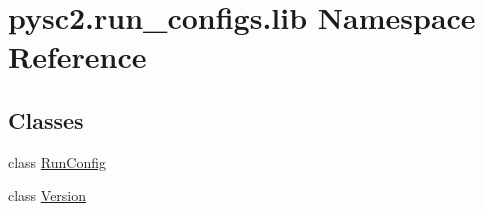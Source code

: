 \hypertarget{namespacepysc2_1_1run__configs_1_1lib}{}\section{pysc2.\+run\+\_\+configs.\+lib Namespace Reference}
\label{namespacepysc2_1_1run__configs_1_1lib}
\subsection*{Classes}
\begin{DoxyCompactItemize}
\item 
class \mbox{\hyperlink{classpysc2_1_1run__configs_1_1lib_1_1_run_config}{Run\+Config}}
\item 
class \mbox{\hyperlink{classpysc2_1_1run__configs_1_1lib_1_1_version}{Version}}
\end{DoxyCompactItemize}
